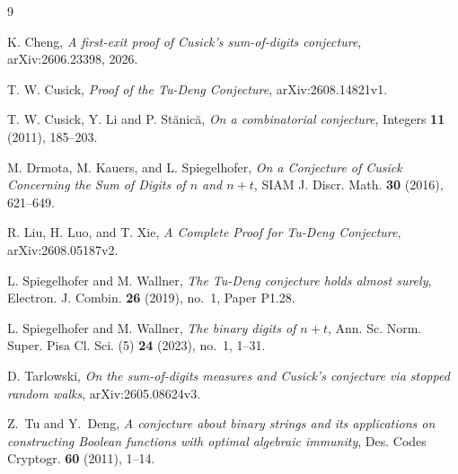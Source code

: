\documentclass[10pt,a4paper]{article}
\begin{document}
\begin{thebibliography}{9}

K. Cheng,
\emph{A first-exit proof of Cusick's sum-of-digits conjecture},
arXiv:2606.23398, 2026.

T. W. Cusick,
\emph{Proof of the Tu-Deng Conjecture},
arXiv:2608.14821v1.

T. W. Cusick, Y. Li and P. St\u{a}nic\u{a},
\emph{On a combinatorial conjecture},
Integers \textbf{11} (2011), 185--203.

M. Drmota, M. Kauers, and L. Spiegelhofer,
\emph{On a Conjecture of Cusick Concerning the Sum of Digits of $n$ and $n+t$},
SIAM J. Discr. Math. \textbf{30} (2016), 621--649.

R. Liu, H. Luo, and T. Xie,
\emph{A Complete Proof for Tu-Deng Conjecture},
arXiv:2608.05187v2.

L. Spiegelhofer and M. Wallner,
\emph{The Tu-Deng conjecture holds almost surely},
Electron. J. Combin. \textbf{26} (2019), no.~1, Paper P1.28.

L. Spiegelhofer and M. Wallner,
\emph{The binary digits of $n+t$},
Ann. Sc. Norm. Super. Pisa Cl. Sci. (5) \textbf{24} (2023), no.~1, 1--31.

D. Tarlowski,
\emph{On the sum-of-digits measures and Cusick's conjecture via stopped random walks},
arXiv:2605.08624v3.

Z.~Tu and Y.~Deng,
\emph{A conjecture about binary strings and its applications on constructing Boolean functions with optimal algebraic immunity},
Des. Codes Cryptogr. \textbf{60} (2011), 1--14.

\end{thebibliography}
\end{document}
